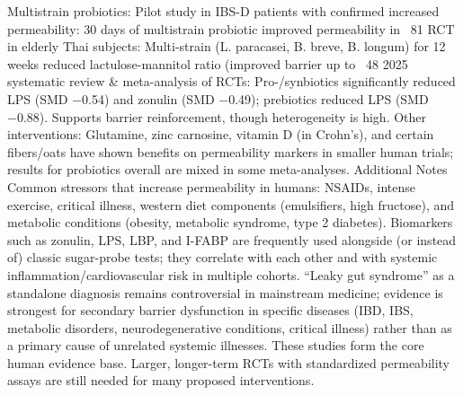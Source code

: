 Multistrain probiotics:
Pilot study in IBS-D patients with confirmed increased permeability: 30 days of multistrain probiotic improved permeability in ~81%
RCT in elderly Thai subjects: Multi-strain (L. paracasei, B. breve, B. longum) for 12 weeks reduced lactulose-mannitol ratio (improved barrier up to ~48%
2025 systematic review & meta-analysis of RCTs: Pro-/synbiotics significantly reduced LPS (SMD −0.54) and zonulin (SMD −0.49); prebiotics reduced LPS (SMD −0.88). Supports barrier reinforcement, though heterogeneity is high.
Other interventions: Glutamine, zinc carnosine, vitamin D (in Crohn’s), and certain fibers/oats have shown benefits on permeability markers in smaller human trials; results for probiotics overall are mixed in some meta-analyses.
Additional Notes
Common stressors that increase permeability in humans: NSAIDs, intense exercise, critical illness, western diet components (emulsifiers, high fructose), and metabolic conditions (obesity, metabolic syndrome, type 2 diabetes).
Biomarkers such as zonulin, LPS, LBP, and I-FABP are frequently used alongside (or instead of) classic sugar-probe tests; they correlate with each other and with systemic inflammation/cardiovascular risk in multiple cohorts.
“Leaky gut syndrome” as a standalone diagnosis remains controversial in mainstream medicine; evidence is strongest for secondary barrier dysfunction in specific diseases (IBD, IBS, metabolic disorders, neurodegenerative conditions, critical illness) rather than as a primary cause of unrelated systemic illnesses.
These studies form the core human evidence base. Larger, longer-term RCTs with standardized permeability assays are still needed for many proposed interventions.
